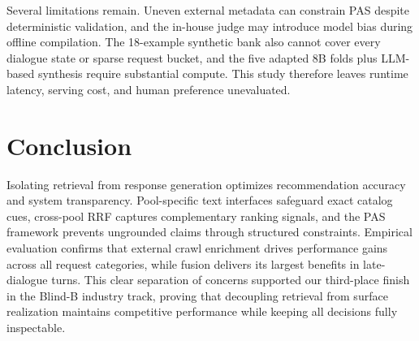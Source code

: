 \documentclass[sigconf]{acmart}
\begin{document}
Several limitations remain. Uneven external metadata can constrain PAS despite deterministic validation, and the in-house judge may introduce model bias during offline compilation. The 18-example synthetic bank also cannot cover every dialogue state or sparse request bucket, and the five adapted 8B folds plus LLM-based synthesis require substantial compute. This study therefore leaves runtime latency, serving cost, and human preference unevaluated.

\section{Conclusion}

Isolating retrieval from response generation optimizes recommendation accuracy and system transparency. Pool-specific text interfaces safeguard exact catalog cues, cross-pool RRF captures complementary ranking signals, and the PAS framework prevents ungrounded claims through structured constraints. Empirical evaluation confirms that external crawl enrichment drives performance gains across all request categories, while fusion delivers its largest benefits in late-dialogue turns. This clear separation of concerns supported our third-place finish in the Blind-B industry track, proving that decoupling retrieval from surface realization maintains competitive performance while keeping all decisions fully inspectable.

\clearpage
\begingroup
{}


\endgroup

\ifdefined\withappendix
  \clearpage
  
\fi
\end{document}
